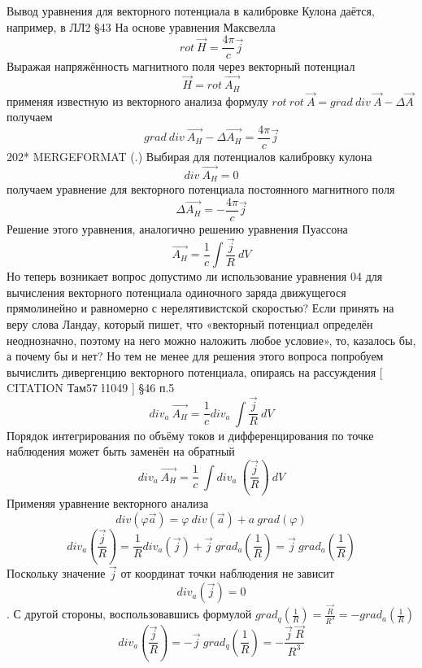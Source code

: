 \documentclass[11pt]{article}
\begin{document}
    Вывод уравнения для векторного потенциала в калибровке Кулона даётся,
например, в ЛЛ2 §43 На основе уравнения Максвелла
\[rot\ \overrightarrow{H}=\frac{4\pi }{c}\overrightarrow{j}\] Выражая
напряжённость магнитного поля через векторный потенциал
\[\overrightarrow{H}=rot\ \overrightarrow{{{A}_{H}}}\] применяя
известную из векторного анализа формулу
\(rot\ rot\ \overrightarrow{A}=grad\ div\ \overrightarrow{A}-\Delta \overrightarrow{A}\)
получаем
\[grad\ div\ \overrightarrow{{{A}_{H}}}-\Delta \overrightarrow{{{A}_{H}}}=\frac{4\pi }{c}\overrightarrow{j}\]
202* MERGEFORMAT (.) Выбирая для потенциалов калибровку кулона
\[div\ \overrightarrow{{{A}_{H}}}=0\] получаем уравнение для векторного
потенциала постоянного магнитного поля
\[\Delta \overrightarrow{{{A}_{H}}}=-\frac{4\pi }{c}\overrightarrow{j}\]
Решение этого уравнения, аналогично решению уравнения Пуассона
\[\overrightarrow{{{A}_{H}}}=\frac{1}{c}\int{\frac{\overrightarrow{j}}{R}}\ dV\]
Но теперь возникает вопрос допустимо ли использование уравнения 04 для
вычисления векторного потенциала одиночного заряда движущегося
прямолинейно и равномерно с нерелятивистской скоростью? Если принять на
веру слова Ландау, который пишет, что «векторный потенциал определён
неоднозначно, поэтому на него можно наложить любое условие», то,
казалось бы, а почему бы и нет? Но тем не менее для решения этого
вопроса попробуем вычислить дивергенцию векторного потенциала, опираясь
на рассуждения {[} CITATION Там57 \l 1049 {]} §46 п.5
\[di{{v}_{a}}\ \overrightarrow{{{A}_{H}}}=\frac{1}{c}di{{v}_{a}}\ \int{\frac{\overrightarrow{j}}{R}}\ dV\]
Порядок интегрирования по объёму токов и дифференцирования по точке
наблюдения может быть заменён на обратный
\[di{{v}_{a}}\ \overrightarrow{{{A}_{H}}}=\frac{1}{c}\ \int{di{{v}_{a}}\ \left( \frac{\overrightarrow{j}}{R} \right)}\ dV\]
Применяя уравнение векторного анализа
\[div\left( \varphi \overrightarrow{a} \right)=\varphi \ div\left( \overrightarrow{a} \right)+a\ grad\left( \varphi  \right)\]
\[di{{v}_{a}}\left( \frac{\overrightarrow{j}}{R} \right)=\frac{1}{R}di{{v}_{a}}\left( \overrightarrow{j} \right)+\overrightarrow{j}\ gra{{d}_{a}}\left( \frac{1}{R} \right)=\overrightarrow{j}\ gra{{d}_{a}}\left( \frac{1}{R} \right)\]
Поскольку значение \(\overrightarrow{j}\) от координат точки наблюдения
не зависит \[di{{v}_{a}}\left( \overrightarrow{j} \right)=0\]. С другой
стороны, воспользовавшись формулой
\(gra{{d}_{q}}\left( \frac{1}{R} \right)=\frac{\overrightarrow{R}}{{{R}^{3}}}=-gra{{d}_{a}}\left( \frac{1}{R} \right)\)
\[di{{v}_{a}}\left( \frac{\overrightarrow{j}}{R} \right)=-\overrightarrow{j}\ gra{{d}_{q}}\left( \frac{1}{R} \right)=-\frac{\overrightarrow{j}\ \overrightarrow{R}}{{{R}^{3}}}\]
\end{document}
